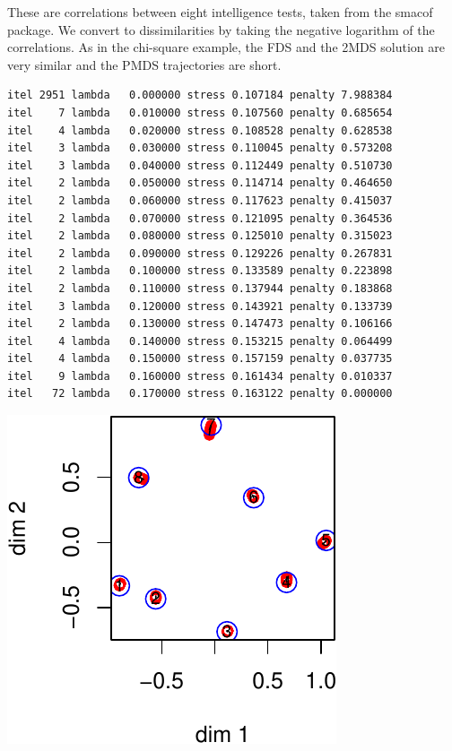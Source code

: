 \documentclass[
  12pt,
  letterpaper,
  DIV=11,
  numbers=noendperiod]{scrreprt}
\theoremstyle{remark}
\begin{document}
These are correlations between eight intelligence tests, taken from the
smacof package. We convert to dissimilarities by taking the negative
logarithm of the correlations. As in the chi-square example, the FDS and
the 2MDS solution are very similar and the PMDS trajectories are short.

\begin{verbatim}
itel 2951 lambda   0.000000 stress 0.107184 penalty 7.988384 
itel    7 lambda   0.010000 stress 0.107560 penalty 0.685654 
itel    4 lambda   0.020000 stress 0.108528 penalty 0.628538 
itel    3 lambda   0.030000 stress 0.110045 penalty 0.573208 
itel    3 lambda   0.040000 stress 0.112449 penalty 0.510730 
itel    2 lambda   0.050000 stress 0.114714 penalty 0.464650 
itel    2 lambda   0.060000 stress 0.117623 penalty 0.415037 
itel    2 lambda   0.070000 stress 0.121095 penalty 0.364536 
itel    2 lambda   0.080000 stress 0.125010 penalty 0.315023 
itel    2 lambda   0.090000 stress 0.129226 penalty 0.267831 
itel    2 lambda   0.100000 stress 0.133589 penalty 0.223898 
itel    2 lambda   0.110000 stress 0.137944 penalty 0.183868 
itel    3 lambda   0.120000 stress 0.143921 penalty 0.133739 
itel    2 lambda   0.130000 stress 0.147473 penalty 0.106166 
itel    4 lambda   0.140000 stress 0.153215 penalty 0.064499 
itel    4 lambda   0.150000 stress 0.157159 penalty 0.037735 
itel    9 lambda   0.160000 stress 0.161434 penalty 0.010337 
itel   72 lambda   0.170000 stress 0.163122 penalty 0.000000 
\end{verbatim}

\begin{center}
\includegraphics{global_files/figure-pdf/intelligence-1.pdf}
\end{center}
\end{document}
